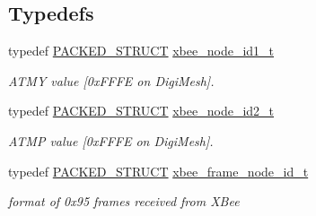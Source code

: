 \subsection*{Typedefs}
\begin{DoxyCompactItemize}
\item 
typedef \hyperlink{group___s_x_a_ga4233297bd31be5c273d4fb0758cc54d7}{P\-A\-C\-K\-E\-D\-\_\-\-S\-T\-R\-U\-C\-T} \hyperlink{group__xbee__discovery_gaf00a7a98eff47e084bf5f8741bf41220}{xbee\-\_\-node\-\_\-id1\-\_\-t}
\begin{DoxyCompactList}\small\item\em A\-T\-M\-Y value \mbox{[}0x\-F\-F\-F\-E on Digi\-Mesh\mbox{]}. \end{DoxyCompactList}\item 
typedef \hyperlink{group___s_x_a_ga4233297bd31be5c273d4fb0758cc54d7}{P\-A\-C\-K\-E\-D\-\_\-\-S\-T\-R\-U\-C\-T} \hyperlink{group__xbee__discovery_ga4c7c2f1049e4dc4bb4552269077cf4fc}{xbee\-\_\-node\-\_\-id2\-\_\-t}
\begin{DoxyCompactList}\small\item\em A\-T\-M\-P value \mbox{[}0x\-F\-F\-F\-E on Digi\-Mesh\mbox{]}. \end{DoxyCompactList}\item 
typedef \hyperlink{group___s_x_a_ga4233297bd31be5c273d4fb0758cc54d7}{P\-A\-C\-K\-E\-D\-\_\-\-S\-T\-R\-U\-C\-T} \hyperlink{group__xbee__discovery_ga6343d5dfdcee86d1d294b1bafb8d6f23}{xbee\-\_\-frame\-\_\-node\-\_\-id\-\_\-t}
\begin{DoxyCompactList}\small\item\em format of 0x95 frames received from X\-Bee \end{DoxyCompactList}\end{DoxyCompactItemize}
